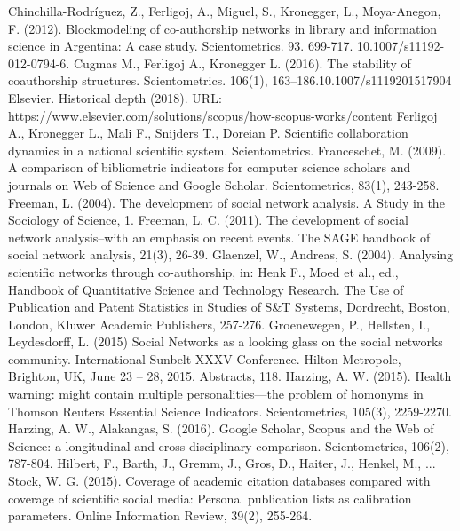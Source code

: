 \documentclass[11pt]{article} %
\begin{document}
\begin{thebibliography}{99}
   Chinchilla-Rodríguez, Z., Ferligoj, A., Miguel, S., Kronegger, L., Moya-Anegon, F. (2012). Blockmodeling of co-authorship networks in library and information science in Argentina: A case study. Scientometrics. 93. 699-717. 10.1007/s11192-012-0794-6.
   Cugmas M., Ferligoj A., Kronegger L. (2016). The stability of coauthorship structures. Scientometrics. 106(1), 163–186.10.1007/s1119201517904
   Elsevier. Historical depth (2018). URL: https://www.elsevier.com/solutions/scopus/how-scopus-works/content
   Ferligoj A., Kronegger L., Mali F., Snijders T., Doreian P. Scientific collaboration dynamics in a national scientific system. Scientometrics.
   Franceschet, M. (2009). A comparison of bibliometric indicators for computer science scholars and journals on Web of Science and Google Scholar. Scientometrics, 83(1), 243-258.
   Freeman, L. (2004). The development of social network analysis. A Study in the Sociology of Science, 1.
   Freeman, L. C. (2011). The development of social network analysis–with an emphasis on recent events. The SAGE handbook of social network analysis, 21(3), 26-39.
   Glaenzel, W., Andreas, S. (2004). Analysing scientific networks through co-authorship, in: Henk F., Moed et al., ed., Handbook of Quantitative Science and Technology Research. The Use of Publication and Patent Statistics in Studies of S\&T Systems, Dordrecht, Boston, London, Kluwer Academic Publishers, 257-276.
   Groenewegen, P., Hellsten, I., Leydesdorff, L. (2015) Social Networks as a looking glass on the social networks community. International Sunbelt XXXV Conference. Hilton Metropole, Brighton, UK, June 23 – 28, 2015. Abstracts, 118. 
   Harzing, A. W. (2015). Health warning: might contain multiple personalities—the problem of homonyms in Thomson Reuters Essential Science Indicators. Scientometrics, 105(3), 2259-2270.
   Harzing, A. W., Alakangas, S. (2016). Google Scholar, Scopus and the Web of Science: a longitudinal and cross-disciplinary comparison. Scientometrics, 106(2), 787-804.
   Hilbert, F., Barth, J., Gremm, J., Gros, D., Haiter, J., Henkel, M., ... Stock, W. G. (2015). Coverage of academic citation databases compared with coverage of scientific social media: Personal publication lists as calibration parameters. Online Information Review, 39(2), 255-264.

\end{thebibliography}
\end{document}
